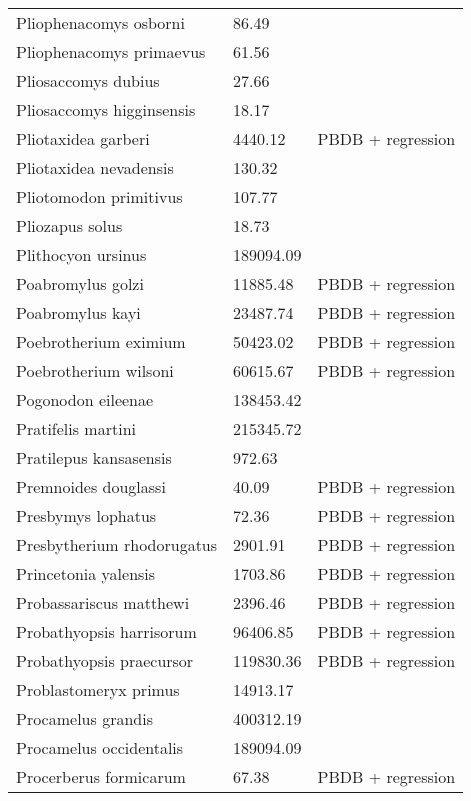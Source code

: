 \documentclass{article}
\begin{document}
\begin{center}
\begin{longtable}{p{} p{} p{} }
  Pliophenacomys osborni & 86.49 & \cite{Tomiya2013} \\ 
  Pliophenacomys primaevus & 61.56 & \cite{Tomiya2013} \\ 
  Pliosaccomys dubius & 27.66 & \cite{Tomiya2013} \\ 
  Pliosaccomys higginsensis & 18.17 & \cite{Tomiya2013} \\ 
  Pliotaxidea garberi & 4440.12 & PBDB + regression \\ 
  Pliotaxidea nevadensis & 130.32 & \cite{Tomiya2013} \\ 
  Pliotomodon primitivus & 107.77 & \cite{Tomiya2013} \\ 
  Pliozapus solus & 18.73 & \cite{Tomiya2013} \\ 
  Plithocyon ursinus & 189094.09 & \cite{Tomiya2013} \\ 
  Poabromylus golzi & 11885.48 & PBDB + regression \\ 
  Poabromylus kayi & 23487.74 & PBDB + regression \\ 
  Poebrotherium eximium & 50423.02 & PBDB + regression \\ 
  Poebrotherium wilsoni & 60615.67 & PBDB + regression \\ 
  Pogonodon eileenae & 138453.42 & \cite{Fox2011b} \\ 
  Pratifelis martini & 215345.72 & \cite{Tomiya2013} \\ 
  Pratilepus kansasensis & 972.63 & \cite{Tomiya2013} \\ 
  Premnoides douglassi & 40.09 & PBDB + regression \\ 
  Presbymys lophatus & 72.36 & PBDB + regression \\ 
  Presbytherium rhodorugatus & 2901.91 & PBDB + regression \\ 
  Princetonia yalensis & 1703.86 & PBDB + regression \\ 
  Probassariscus matthewi & 2396.46 & PBDB + regression \\ 
  Probathyopsis harrisorum & 96406.85 & PBDB + regression \\ 
  Probathyopsis praecursor & 119830.36 & PBDB + regression \\ 
  Problastomeryx primus & 14913.17 & \cite{Tomiya2013} \\ 
  Procamelus grandis & 400312.19 & \cite{Tomiya2013} \\ 
  Procamelus occidentalis & 189094.09 & \cite{Tomiya2013} \\ 
  Procerberus formicarum & 67.38 & PBDB + regression \\ 

\end{longtable}
\end{center}
\end{document}
